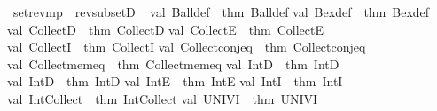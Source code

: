 \begin{isabellebody}
\isamarkupfalse%
\ set{\isacharunderscore}{\kern0pt}rev{\isacharunderscore}{\kern0pt}mp\ {\isacharequal}{\kern0pt}\ rev{\isacharunderscore}{\kern0pt}subsetD\isanewline
%
\isadelimML
\isanewline
%
\endisadelimML
%
\isatagML
{}\isamarkupfalse%
\ {\isacartoucheopen}\isanewline
val\ Ball{\isacharunderscore}{\kern0pt}def\ {\isacharequal}{\kern0pt}\ {\isacharat}{\kern0pt}{\isacharbraceleft}{\kern0pt}thm\ Ball{\isacharunderscore}{\kern0pt}def{\isacharbraceright}{\kern0pt}\isanewline
val\ Bex{\isacharunderscore}{\kern0pt}def\ {\isacharequal}{\kern0pt}\ {\isacharat}{\kern0pt}{\isacharbraceleft}{\kern0pt}thm\ Bex{\isacharunderscore}{\kern0pt}def{\isacharbraceright}{\kern0pt}\isanewline
val\ CollectD\ {\isacharequal}{\kern0pt}\ {\isacharat}{\kern0pt}{\isacharbraceleft}{\kern0pt}thm\ CollectD{\isacharbraceright}{\kern0pt}\isanewline
val\ CollectE\ {\isacharequal}{\kern0pt}\ {\isacharat}{\kern0pt}{\isacharbraceleft}{\kern0pt}thm\ CollectE{\isacharbraceright}{\kern0pt}\isanewline
val\ CollectI\ {\isacharequal}{\kern0pt}\ {\isacharat}{\kern0pt}{\isacharbraceleft}{\kern0pt}thm\ CollectI{\isacharbraceright}{\kern0pt}\isanewline
val\ Collect{\isacharunderscore}{\kern0pt}conj{\isacharunderscore}{\kern0pt}eq\ {\isacharequal}{\kern0pt}\ {\isacharat}{\kern0pt}{\isacharbraceleft}{\kern0pt}thm\ Collect{\isacharunderscore}{\kern0pt}conj{\isacharunderscore}{\kern0pt}eq{\isacharbraceright}{\kern0pt}\isanewline
val\ Collect{\isacharunderscore}{\kern0pt}mem{\isacharunderscore}{\kern0pt}eq\ {\isacharequal}{\kern0pt}\ {\isacharat}{\kern0pt}{\isacharbraceleft}{\kern0pt}thm\ Collect{\isacharunderscore}{\kern0pt}mem{\isacharunderscore}{\kern0pt}eq{\isacharbraceright}{\kern0pt}\isanewline
val\ IntD{}\ {\isacharequal}{\kern0pt}\ {\isacharat}{\kern0pt}{\isacharbraceleft}{\kern0pt}thm\ IntD{}{\isacharbraceright}{\kern0pt}\isanewline
val\ IntD{}\ {\isacharequal}{\kern0pt}\ {\isacharat}{\kern0pt}{\isacharbraceleft}{\kern0pt}thm\ IntD{}{\isacharbraceright}{\kern0pt}\isanewline
val\ IntE\ {\isacharequal}{\kern0pt}\ {\isacharat}{\kern0pt}{\isacharbraceleft}{\kern0pt}thm\ IntE{\isacharbraceright}{\kern0pt}\isanewline
val\ IntI\ {\isacharequal}{\kern0pt}\ {\isacharat}{\kern0pt}{\isacharbraceleft}{\kern0pt}thm\ IntI{\isacharbraceright}{\kern0pt}\isanewline
val\ Int{\isacharunderscore}{\kern0pt}Collect\ {\isacharequal}{\kern0pt}\ {\isacharat}{\kern0pt}{\isacharbraceleft}{\kern0pt}thm\ Int{\isacharunderscore}{\kern0pt}Collect{\isacharbraceright}{\kern0pt}\isanewline
val\ UNIV{\isacharunderscore}{\kern0pt}I\ {\isacharequal}{\kern0pt}\ {\isacharat}{\kern0pt}{\isacharbraceleft}{\kern0pt}thm\ UNIV{\isacharunderscore}{\kern0pt}I{\isacharbraceright}{\kern0pt}\isanewline

\end{isabellebody}
